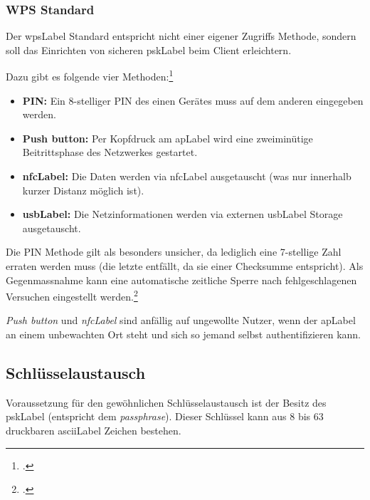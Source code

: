 \subsubsection{WPS Standard}
Der \gls{wpsLabel} Standard entspricht nicht einer eigener Zugriffs Methode, sondern soll das Einrichten von sicheren \gls{pskLabel} beim Client erleichtern.

Dazu gibt es folgende vier Methoden:\footcite{Wi-Fi_Protected_Setup_-_Wikipedia_the_free_encyclopedia_2015-04-10}
\begin{itemize}
	\item \textbf{PIN:} Ein 8-stelliger PIN des einen Gerätes muss auf dem anderen eingegeben werden.
	\item \textbf{Push button:} Per Kopfdruck am \gls{apLabel} wird eine zweiminütige Beitrittsphase des Netzwerkes gestartet.
	\item \textbf{\gls{nfcLabel}:} Die Daten werden via \gls{nfcLabel} ausgetauscht (was nur innerhalb kurzer Distanz möglich ist).
	\item \textbf{\gls{usbLabel}:} Die Netzinformationen werden via externen \gls{usbLabel} Storage ausgetauscht.
\end{itemize}

Die PIN Methode gilt als besonders unsicher, da lediglich eine 7-stellige Zahl erraten werden muss (die letzte entfällt, da sie einer Checksumme entspricht).
Als Gegenmassnahme kann eine automatische zeitliche Sperre nach fehlgeschlagenen Versuchen eingestellt werden.\footcite{viehboeck_wps_2015-04-10}

\textit{Push button} und \textit{\gls{nfcLabel}} sind anfällig auf ungewollte Nutzer, wenn der \gls{apLabel} an einem unbewachten Ort steht und sich so jemand selbst authentifizieren kann.


\subsection{Schlüsselaustausch}
Voraussetzung für den gewöhnlichen Schlüsselaustausch ist der Besitz des \gls{pskLabel} (entspricht dem \textit{passphrase}).
Dieser Schlüssel kann aus 8 bis 63 druckbaren \gls{asciiLabel} Zeichen bestehen.

